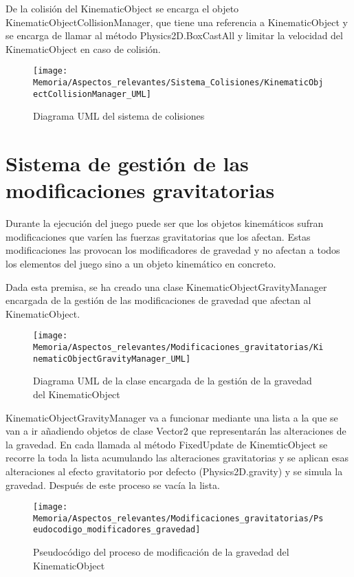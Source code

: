 De la colisión del KinematicObject se encarga el objeto KinematicObjectCollisionManager, que tiene una referencia a KinematicObject y se encarga de llamar al método Physics2D.BoxCastAll y limitar la velocidad del KinematicObject en caso de colisión.

\begin{figure}[h]
\centering
\texttt{[image: Memoria/Aspectos\_relevantes/Sistema\_Colisiones/KinematicObjectCollisionManager\_UML]}
\caption{Diagrama UML del sistema de colisiones}
\end{figure}

\section{Sistema de gestión de las modificaciones gravitatorias}
Durante la ejecución del juego puede ser que los objetos kinemáticos sufran modificaciones que varíen las fuerzas gravitatorias que los afectan. Estas modificaciones las provocan los modificadores de gravedad y no afectan a todos los elementos del juego sino a un objeto kinemático en concreto.

Dada esta premisa, se ha creado una clase KinematicObjectGravityManager encargada de la gestión de las modificaciones de gravedad que afectan al KinematicObject.

\begin{figure}[h]
\centering
\texttt{[image: Memoria/Aspectos\_relevantes/Modificaciones\_gravitatorias/KinematicObjectGravityManager\_UML]}
\caption{Diagrama UML de la clase encargada de la gestión de la gravedad del KinematicObject}
\end{figure}

KinematicObjectGravityManager va a funcionar mediante una lista a la que se van a ir añadiendo objetos de clase Vector2 que representarán las alteraciones de la gravedad. En cada llamada al método FixedUpdate de KinemticObject se recorre la toda la lista acumulando las alteraciones gravitatorias y se aplican esas alteraciones al efecto gravitatorio por defecto (Physics2D.gravity) y se simula la gravedad. Después de este proceso se vacía la lista.

\begin{figure}[h]
\centering
\texttt{[image: Memoria/Aspectos\_relevantes/Modificaciones\_gravitatorias/Pseudocodigo\_modificadores\_gravedad]}
\caption{Pseudocódigo del proceso de modificación de la gravedad del KinematicObject}
\end{figure}

